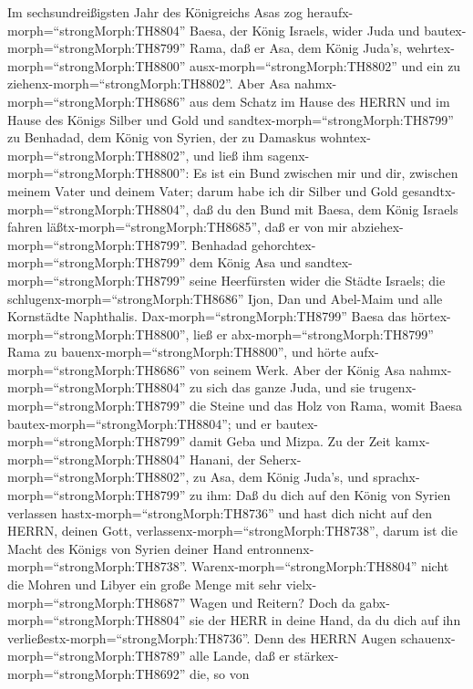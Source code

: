  Im sechsundreißigsten Jahr des Königreichs Asas zog
heraufx-morph=``strongMorph:TH8804'' Baesa, der König Israels, wider
Juda und bautex-morph=``strongMorph:TH8799'' Rama, daß er Asa, dem König
Juda's, wehrtex-morph=``strongMorph:TH8800''
ausx-morph=``strongMorph:TH8802'' und ein zu
ziehenx-morph=``strongMorph:TH8802''.  Aber Asa
nahmx-morph=``strongMorph:TH8686'' aus dem Schatz im Hause des HERRN und
im Hause des Königs Silber und Gold und
sandtex-morph=``strongMorph:TH8799'' zu Benhadad, dem König von Syrien,
der zu Damaskus wohntex-morph=``strongMorph:TH8802'', und ließ ihm
sagenx-morph=``strongMorph:TH8800'':  Es ist ein Bund
zwischen mir und dir, zwischen meinem Vater und deinem Vater; darum habe
ich dir Silber und Gold gesandtx-morph=``strongMorph:TH8804'', daß du
den Bund mit Baesa, dem König Israels fahren
läßtx-morph=``strongMorph:TH8685'', daß er von mir
abziehex-morph=``strongMorph:TH8799''.  Benhadad
gehorchtex-morph=``strongMorph:TH8799'' dem König Asa und
sandtex-morph=``strongMorph:TH8799'' seine Heerfürsten wider die Städte
Israels; die schlugenx-morph=``strongMorph:TH8686'' Ijon, Dan und
Abel-Maim und alle Kornstädte Naphthalis. 
Dax-morph=``strongMorph:TH8799'' Baesa das
hörtex-morph=``strongMorph:TH8800'', ließ er
abx-morph=``strongMorph:TH8799'' Rama zu
bauenx-morph=``strongMorph:TH8800'', und hörte
aufx-morph=``strongMorph:TH8686'' von seinem Werk.  Aber der
König Asa nahmx-morph=``strongMorph:TH8804'' zu sich das ganze Juda, und
sie trugenx-morph=``strongMorph:TH8799'' die Steine und das Holz von
Rama, womit Baesa bautex-morph=``strongMorph:TH8804''; und er
bautex-morph=``strongMorph:TH8799'' damit Geba und Mizpa. 
Zu der Zeit kamx-morph=``strongMorph:TH8804'' Hanani, der
Seherx-morph=``strongMorph:TH8802'', zu Asa, dem König Juda's, und
sprachx-morph=``strongMorph:TH8799'' zu ihm: Daß du dich auf den König
von Syrien verlassen hastx-morph=``strongMorph:TH8736'' und hast dich
nicht auf den HERRN, deinen Gott,
verlassenx-morph=``strongMorph:TH8738'', darum ist die Macht des Königs
von Syrien deiner Hand entronnenx-morph=``strongMorph:TH8738''.
 Warenx-morph=``strongMorph:TH8804'' nicht die Mohren und
Libyer ein große Menge mit sehr vielx-morph=``strongMorph:TH8687'' Wagen
und Reitern? Doch da gabx-morph=``strongMorph:TH8804'' sie der HERR in
deine Hand, da du dich auf ihn verließestx-morph=``strongMorph:TH8736''.
 Denn des HERRN Augen schauenx-morph=``strongMorph:TH8789''
alle Lande, daß er stärkex-morph=``strongMorph:TH8692'' die, so von
